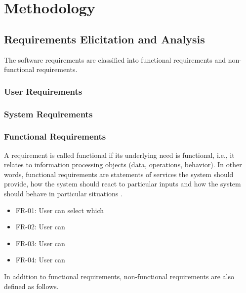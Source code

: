 \newpage
\chapter{Methodology}

\section{Requirements Elicitation and Analysis}
The software requirements are classified into functional requirements and non-functional requirements.

\subsection{User Requirements}

\subsection{System Requirements}

\subsection{Functional Requirements}
A requirement is called functional if its underlying need is functional, i.e., it relates to information processing objects (data, operations, behavior). In other words, functional requirements are statements of services the system should provide, how the system should react to particular inputs and how the system should behave in particular situations \autocite{sommerville2011software}.
\begin{itemize}
  \item FR-01: User can select which
  \item FR-02: User can
  \item FR-03: User can
  \item FR-04: User can
\end{itemize}

In addition to functional requirements, non-functional requirements are also defined as follows.

